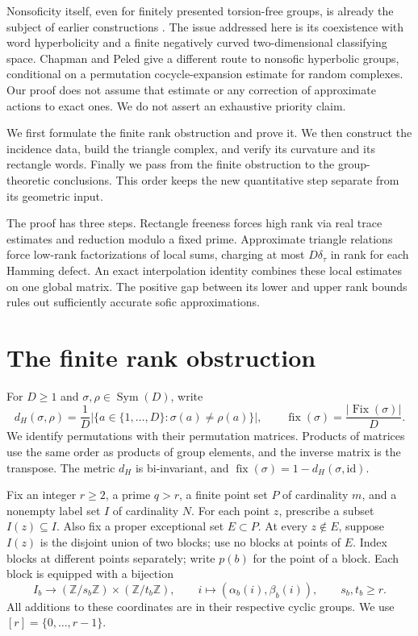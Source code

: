 \documentclass[11pt]{amsart}
\theoremstyle{definition}
\theoremstyle{remark}
\numberwithin{equation}{section}
\newcommand{\Z}{\mathbb Z}
\newcommand{\id}{\mathrm{id}}
\DeclareMathOperator{\Sym}{Sym}
\DeclareMathOperator{\Fix}{Fix}
\begin{document}
Nonsoficity itself, even for finitely presented torsion-free groups,
is already the subject of earlier constructions
\cite{OA197,FF,KT}. The issue addressed here is its coexistence with
word hyperbolicity and a finite negatively curved two-dimensional
classifying space. Chapman and Peled \cite[Theorem~1.1]{CP} give a
different route to nonsofic hyperbolic groups, conditional on a
permutation cocycle-expansion estimate for random complexes. Our
proof does not assume that estimate or any correction of approximate
actions to exact ones. We do not assert an exhaustive priority claim.

We first formulate the finite rank obstruction and prove it. We then
construct the incidence data, build the triangle complex, and verify
its curvature and its rectangle words. Finally we pass from the
finite obstruction to the group-theoretic conclusions. This order
keeps the new quantitative step separate from its geometric input.

The proof has three steps. Rectangle freeness forces high rank via
real trace estimates and reduction modulo a fixed prime. Approximate
triangle relations force low-rank factorizations of local sums,
charging at most $D\delta_\tau$ in rank for each Hamming defect.
An exact interpolation identity combines these local estimates on
one global matrix. The positive gap between its lower and upper
rank bounds rules out sufficiently accurate sofic approximations.

\section{The finite rank obstruction}\label{sec:rank}

For $D\ge1$ and $\sigma,\rho\in\Sym(D)$, write
\[
 d_H(\sigma,\rho)=\frac{1}{D}
       |\{a\in\{1,\ldots,D\}:\sigma(a)\ne\rho(a)\}|,
 \qquad
 \operatorname{fix}(\sigma)=\frac{|\Fix(\sigma)|}{D}.
\]
We identify permutations with their permutation matrices. Products
of matrices use the same order as products of group elements, and
the inverse matrix is the transpose. The metric $d_H$ is bi-invariant,
and $\operatorname{fix}(\sigma)=1-d_H(\sigma,\id)$.

Fix an integer $r\ge2$, a prime $q>r$, a finite point set $P$ of
cardinality $m$, and a nonempty label set $I$ of cardinality $N$.
For each point $z$, prescribe a subset $I(z)\subseteq I$. Also fix a
proper exceptional set $E\subset P$. At every $z\notin E$, suppose
$I(z)$ is the disjoint union of two blocks; use no blocks at points
of $E$. Index blocks at different
points separately; write $p(b)$ for the point of a block. Each block
is equipped with a bijection
\begin{equation}\label{eq:block-coordinates}
 I_b\longrightarrow (\Z/s_b\Z)\times(\Z/t_b\Z),
 \qquad i\longmapsto(\alpha_b(i),\beta_b(i)),\qquad s_b,t_b\ge r.
\end{equation}
All additions to these coordinates are in their respective cyclic groups. We use $[r]=\{0,\ldots,r-1\}$.
\end{document}
